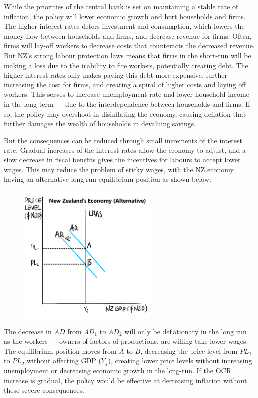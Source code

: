 \documentclass[a4paper,12pt]{article}
\begin{document}

While the priorities of the central bank is set on maintaining a stable rate of inflation, the policy will lower economic growth and hurt households and firms. The higher interest rates deters investment and consumption, which lowers the money flow between households and firms, and decrease revenue for firms. Often, firms will lay-off workers to decrease costs that counteracts the decreased revenue. But NZ's strong labour protection laws means that firms in the short-run will be making a loss due to the inability to fire workers, potentially creating debt. The higher interest rates only makes paying this debt more expensive, further increasing the cost for firms, and creating a spiral of higher costs and laying off workers. This serves to increase unemployment rate and lower household income in the long term --- due to the interdependence between households and firms. If so, the policy may overshoot in disinflating the economy, causing deflation that further damages the wealth of households in devaluing savings.

But the consequences can be reduced through small increments of the interest rate. Gradual increases of the interest rates allow the economy to adjust, and a slow decrease in fiscal benefits gives the incentives for labours to accept lower wages. This may reduce the problem of sticky wages, with the NZ economy having an alternative long run equilibrium position as shown below:

\begin{figure}[H]
    \centering
    \includegraphics[width=0.6\textwidth]{assets/macro_alt.png}
\end{figure}

The decrease in $AD$ from $AD_1$ to $AD_2$ will only be deflationary in the long run as the workers --- owners of factors of productions, are willing take lower wages. The equilibrium position moves from $A$ to $B$, decreasing the price level from $PL_1$ to $PL_2$ without affecting GDP ($Y_f$), creating lower price levels without increasing unemployment or decreasing economic growth in the long-run. If the OCR increase is gradual, the policy would be effective at decreasing inflation without these severe consequences.
\end{document}
